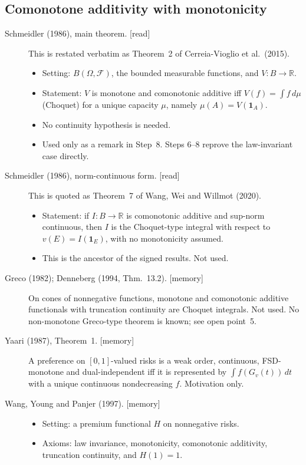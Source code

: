 \subsection{Comonotone additivity with monotonicity}

\begin{description}
\item[Schmeidler (1986), main theorem. {[read]}] This is restated verbatim as Theorem~2 of Cerreia-Vioglio et al.\ (2015).
  \begin{itemize}
  \item Setting: $B(\Omega,\mathcal F)$, the bounded measurable functions, and $V:B\to\mathbb R$.
  \item Statement: $V$ is monotone and comonotonic additive iff $V(f)=\int f\,d\mu$ (Choquet) for a unique capacity $\mu$, namely $\mu(A)=V(\mathbf 1_A)$.
  \item No continuity hypothesis is needed.
  \item Used only as a remark in Step~8. Steps 6--8 reprove the law-invariant case directly.
  \end{itemize}
\item[Schmeidler (1986), norm-continuous form. {[read]}] This is quoted as Theorem~7 of Wang, Wei and Willmot (2020).
  \begin{itemize}
  \item Statement: if $I:B\to\mathbb R$ is comonotonic additive and sup-norm continuous, then $I$ is the Choquet-type integral with respect to $v(E)=I(\mathbf 1_E)$, with no monotonicity assumed.
  \item This is the ancestor of the signed results. Not used.
  \end{itemize}
\item[Greco (1982); Denneberg (1994, Thm.~13.2). {[memory]}] On cones of nonnegative functions, monotone and comonotonic additive functionals with truncation continuity are Choquet integrals. Not used. No non-monotone Greco-type theorem is known; see open point~5.
\item[Yaari (1987), Theorem~1. {[memory]}] A preference on $[0,1]$-valued risks is a weak order, continuous, FSD-monotone and dual-independent iff it is represented by $\int f(G_v(t))\,dt$ with a unique continuous nondecreasing $f$. Motivation only.
\item[Wang, Young and Panjer (1997). {[memory]}]
  \begin{itemize}
  \item Setting: a premium functional $H$ on nonnegative risks.
  \item Axioms: law invariance, monotonicity, comonotonic additivity, truncation continuity, and $H(1)=1$.

\end{itemize}
\end{description}
